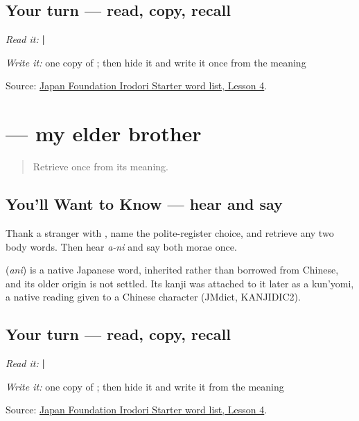 \subsection*{Your turn — read, copy, recall}
\emph{Read it:} \textbf{ | }

\emph{Write it:} one copy of \textbf{}; then hide it and write it once from the meaning

\begin{tcolorbox}[breakable,colback=teal!4,colframe=teal!35!black,title={Before you move on}]
Source: \href{https://www.irodori.jpf.go.jp/assets/data/wordlist\_X.pdf}{Japan Foundation Irodori Starter word list, Lesson 4}.
\end{tcolorbox}
\section[\texorpdfstring{\ja{あに} (ani)}{あに (ani)}]{ — my elder brother}

\label{lesson:JA-C13-ani}



\begin{quote}
Retrieve \textbf{} once from its meaning.
\end{quote}

\subsection*{You'll Want to Know — hear and say}
Thank a stranger with \textbf{}, name the polite-register choice, and retrieve any two body words. Then hear \emph{a-ni} and say both morae once.

\begin{cousinweb}
\textbf{} (\emph{ani}) is a native Japanese word, inherited rather than borrowed from Chinese, and its older origin is not settled. Its kanji was attached to it later as a kun'yomi, a native reading given to a Chinese character (JMdict, KANJIDIC2).
\end{cousinweb}

\subsection*{Your turn — read, copy, recall}
\emph{Read it:} \textbf{ | }

\emph{Write it:} one copy of \textbf{}; then hide it and write it from the meaning

\begin{tcolorbox}[breakable,colback=teal!4,colframe=teal!35!black,title={Before you move on}]
Source: \href{https://www.irodori.jpf.go.jp/assets/data/wordlist\_X.pdf}{Japan Foundation Irodori Starter word list, Lesson 4}.
\end{tcolorbox}
